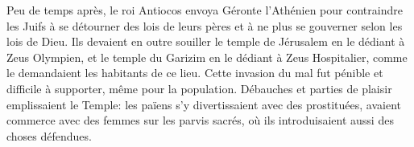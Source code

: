 Peu de temps après, le roi Antiocos envoya Géronte l’Athénien
	pour contraindre les Juifs à se détourner des lois de leurs pères
	et à ne plus se gouverner selon les lois de Dieu.
Ils devaient en outre souiller le temple de Jérusalem en le dédiant à Zeus Olympien,
	et le temple du Garizim en le dédiant à Zeus Hospitalier,
	comme le demandaient les habitants de ce lieu.
Cette invasion du mal fut pénible et difficile à supporter, même pour la population.
Débauches et parties de plaisir emplissaient le Temple:
	les païens s’y divertissaient avec des prostituées,
	avaient commerce avec des femmes sur les parvis sacrés,
	où ils introduisaient aussi des choses défendues.

